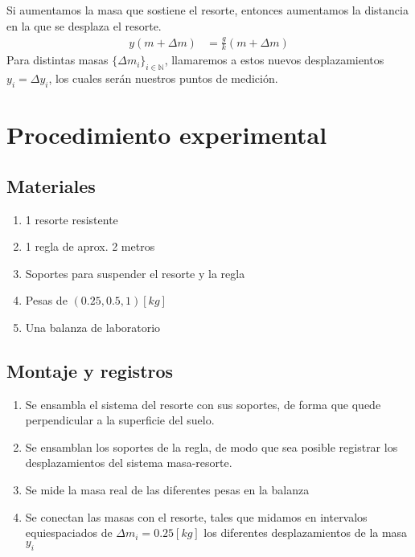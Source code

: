 \documentclass{article}
\begin{document}
\begin{multicols}{2}
\columnbreak

Si aumentamos la masa que sostiene el resorte, entonces aumentamos la distancia en la que se desplaza el resorte.
\begin{align}
    y(m+\Delta m) &= \frac{g}{k}(m+\Delta m)\label{eq:4}
\end{align}
Para distintas masas $\{\Delta m_i\}_{i\in \mathbb{N}}$, llamaremos a estos nuevos desplazamientos $y_i=\Delta y_i$, los cuales serán nuestros puntos de medición. 

\centering
\section{Procedimiento experimental}
\raggedright

\centering
    \subsection{Materiales}
\raggedright

\begin{enumerate}[start=1, label={\bfseries \roman*})]
\item 1 resorte resistente
\item 1 regla de aprox. 2 metros
\item Soportes para suspender el resorte y la regla
\item Pesas de $(0.25, 0.5, 1)[kg]$
\item Una balanza de laboratorio
\end{enumerate}

\centering
    \subsection{Montaje y registros}
\raggedright

\begin{enumerate}[start=1, label={\bfseries \arabic*})]
\item Se ensambla el sistema del resorte con sus soportes, de forma que quede perpendicular a la superficie del suelo.
\item Se ensamblan los soportes de la regla, de modo que sea posible registrar los desplazamientos del sistema masa-resorte.
\item Se mide la masa real de las diferentes pesas en la balanza
\item Se conectan las masas con el resorte, tales que midamos en intervalos equiespaciados de $\Delta m_i=0.25 [kg]$ los diferentes desplazamientos de la masa $y_i$
\end{enumerate}
\newpage


\end{multicols}
\end{document}
